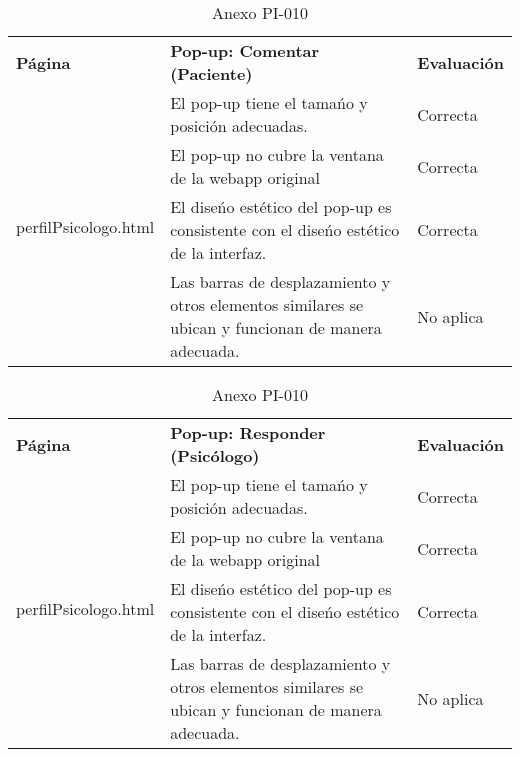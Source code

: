 \begin{table}[htpb]
\centering
\begin{tabularx}{\textwidth}{|l|X|l|}
\hline
\rowcolor[gray]{0.9}\multicolumn{3}{|l|}{\textbf{Anexo PI-010}}                                                                                                                       \\ \hline
\textbf{Página}                       & \textbf{Pop-up: Comentar (Paciente)}                                                               & \textbf{Evaluación} \\ \hline
\multirow{4}{*}{perfilPsicologo.html} & El pop-up tiene el tamańo y posición adecuadas.                                                    & Correcta            \\ \cline{2-3} 
                                      & El pop-up no cubre la ventana de la webapp original                                                & Correcta            \\ \cline{2-3} 
                                      & El diseńo estético del pop-up es consistente con el diseńo estético de la interfaz.                & Correcta            \\ \cline{2-3} 
                                      & Las barras de desplazamiento y otros elementos similares se ubican y funcionan de manera adecuada. & No aplica           \\ \hline
\end{tabularx}
\caption{Anexo PI-010}
\end{table}

%
\begin{table}[htpb]
\centering
\begin{tabularx}{\textwidth}{|l|X|l|}
\hline
\rowcolor[gray]{0.9}\multicolumn{3}{|l|}{\textbf{Anexo PI-010}}                                                                                                                       \\ \hline
\textbf{Página}                       & \textbf{Pop-up: Responder (Psicólogo)}                                                             & \textbf{Evaluación} \\ \hline
\multirow{4}{*}{perfilPsicologo.html} & El pop-up tiene el tamańo y posición adecuadas.                                                    & Correcta            \\ \cline{2-3} 
                                      & El pop-up no cubre la ventana de la webapp original                                                & Correcta            \\ \cline{2-3} 
                                      & El diseńo estético del pop-up es consistente con el diseńo estético de la interfaz.                & Correcta            \\ \cline{2-3} 
                                      & Las barras de desplazamiento y otros elementos similares se ubican y funcionan de manera adecuada. & No aplica           \\ \hline
\end{tabularx}
\caption{Anexo PI-010}
\end{table}

